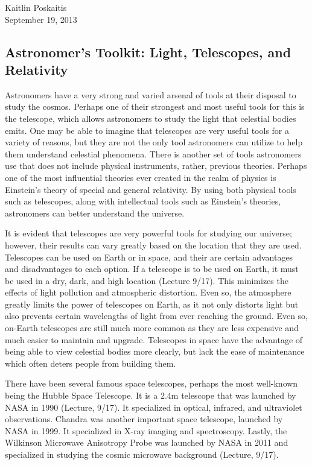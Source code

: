 \documentclass[12pt]{article}
\begin{document}
\noindent Kaitlin Poskaitis\\
September 19, 2013
\begin{center}
\section*{\bf Astronomer’s Toolkit: Light, Telescopes, and Relativity}
\end{center}

Astronomers have a very strong and varied arsenal of tools at their disposal to
study the cosmos.  Perhaps one of their strongest and most useful tools for this
is the telescope, which allows astronomers to study the light that celestial
bodies emits.  One may be able to imagine that telescopes are very useful tools
for a variety of reasons, but they are not the only tool astronomers can utilize
to help them understand celestial phenomena.  There is another set of tools
astronomers use that does not include physical instruments, rather, previous
theories.  Perhaps one of the most influential theories ever created in the
realm of physics is Einstein's theory of special and general relativity.  By
using both physical tools such as telescopes, along with intellectual tools such
as Einstein's theories, astronomers can better understand the universe.


It is evident that telescopes are very powerful tools for studying our universe;
however, their results can vary greatly based on the location that they are
used.  Telescopes can be used on Earth or in space, and their are certain
advantages and disadvantages to each option.  If a telescope is to be used on
Earth, it must be used in a dry, dark, and high location (Lecture 9/17).  This
minimizes the effects of light pollution and atmospheric distortion.  Even so,
the atmosphere greatly limits the power of telescopes on Earth, as it not only
distorts light but also prevents certain wavelengths of light from ever reaching
the ground.  Even so, on-Earth telescopes are still much more common as they are
less expensive and much easier to maintain and upgrade.  Telescopes in space
have the advantage of being able to view celestial bodies more clearly, but lack
the ease of maintenance which often deters people from building them.

There have been several famous space telescopes, perhaps the most well-known
being the Hubble Space Telescope.  It is a 2.4m telescope that was launched by
NASA in 1990 (Lecture, 9/17).  It specialized in optical, infrared, and ultraviolet
observations.  Chandra was another important space telescope, launched by NASA
in 1999.  It specialized in X-ray imaging and spectroscopy.  Lastly,  the
Wilkinson Microwave Anisotropy Probe was launched by NASA in 2011 and
specialized in studying the cosmic microwave background (Lecture, 9/17).
\end{document}
